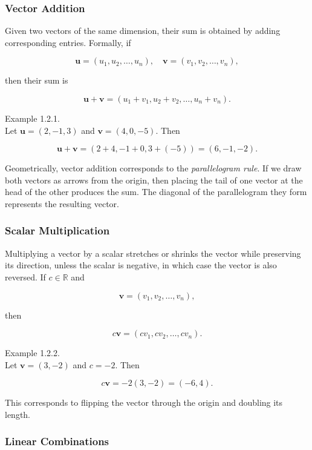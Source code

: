 \documentclass[
  12pt,
  a4paper,
]{article}
\begin{document}
\subsubsection{Vector Addition}\label{vector-addition}

Given two vectors of the same dimension, their sum is obtained by adding
corresponding entries. Formally, if

\[\mathbf{u} = (u_1, u_2, \dots, u_n), \quad 
\mathbf{v} = (v_1, v_2, \dots, v_n),\]

then their sum is

\[\mathbf{u} + \mathbf{v} = (u_1+v_1, u_2+v_2, \dots, u_n+v_n).\]

Example 1.2.1.\\
Let \(\mathbf{u} = (2, -1, 3)\) and \(\mathbf{v} = (4, 0, -5)\). Then

\[\mathbf{u} + \mathbf{v} = (2+4, -1+0, 3+(-5)) = (6, -1, -2).\]

Geometrically, vector addition corresponds to the \emph{parallelogram
rule}. If we draw both vectors as arrows from the origin, then placing
the tail of one vector at the head of the other produces the sum. The
diagonal of the parallelogram they form represents the resulting vector.

\subsubsection{Scalar Multiplication}\label{scalar-multiplication}

Multiplying a vector by a scalar stretches or shrinks the vector while
preserving its direction, unless the scalar is negative, in which case
the vector is also reversed. If \(c \in \mathbb{R}\) and

\[\mathbf{v} = (v_1, v_2, \dots, v_n),\]

then

\[c \mathbf{v} = (c v_1, c v_2, \dots, c v_n).\]

Example 1.2.2.\\
Let \(\mathbf{v} = (3, -2)\) and \(c = -2\). Then

\[c\mathbf{v} = -2(3, -2) = (-6, 4).\]

This corresponds to flipping the vector through the origin and doubling
its length.

\subsubsection{Linear Combinations}\label{linear-combinations}
\end{document}
